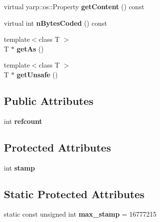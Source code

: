 \begin{DoxyCompactItemize}
\item 
\hypertarget{classemorph_1_1vEvent_a54209948752ced6d6ed0c6a5612dd42b}{virtual yarp\-::os\-::\-Property {\bfseries get\-Content} () const }\label{classemorph_1_1vEvent_a54209948752ced6d6ed0c6a5612dd42b}

\item 
\hypertarget{classemorph_1_1vEvent_a851e06124d640e2f43ef99049a587607}{virtual int {\bfseries n\-Bytes\-Coded} () const }\label{classemorph_1_1vEvent_a851e06124d640e2f43ef99049a587607}

\item 
\hypertarget{classemorph_1_1vEvent_a7a4ea1e06c31602ae08d85e974b24aba}{{\footnotesize template$<$class T $>$ }\\T $\ast$ {\bfseries get\-As} ()}\label{classemorph_1_1vEvent_a7a4ea1e06c31602ae08d85e974b24aba}

\item 
\hypertarget{classemorph_1_1vEvent_affe99b3696590fd050d8912d88006d43}{{\footnotesize template$<$class T $>$ }\\T $\ast$ {\bfseries get\-Unsafe} ()}\label{classemorph_1_1vEvent_affe99b3696590fd050d8912d88006d43}

\end{DoxyCompactItemize}
\subsection*{Public Attributes}
\begin{DoxyCompactItemize}
\item 
\hypertarget{classemorph_1_1vEvent_ac92466be7aee7e911a4fd2d578bfe90b}{int {\bfseries refcount}}\label{classemorph_1_1vEvent_ac92466be7aee7e911a4fd2d578bfe90b}

\end{DoxyCompactItemize}
\subsection*{Protected Attributes}
\begin{DoxyCompactItemize}
\item 
\hypertarget{classemorph_1_1vEvent_aba25704ab1a865d995734bba01813778}{int {\bfseries stamp}}\label{classemorph_1_1vEvent_aba25704ab1a865d995734bba01813778}

\end{DoxyCompactItemize}
\subsection*{Static Protected Attributes}
\begin{DoxyCompactItemize}
\item 
\hypertarget{classemorph_1_1vEvent_aee7f41632af3f665d74a90d89a16dfbc}{static const unsigned int {\bfseries max\-\_\-stamp} = 16777215}\label{classemorph_1_1vEvent_aee7f41632af3f665d74a90d89a16dfbc}

\end{DoxyCompactItemize}



